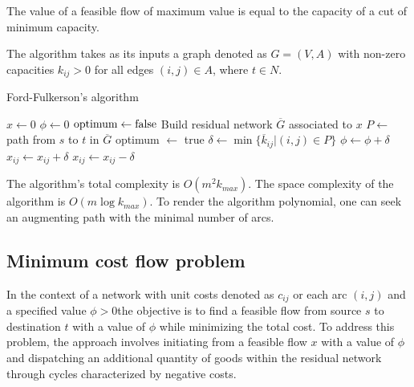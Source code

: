 \begin{theorem}
    The value of a feasible flow of maximum value is equal to the capacity of a cut of minimum capacity.
\end{theorem}
The algorithm takes as its inputs a graph denoted as $G=(V,A)$ with non-zero capacities $k_{ij}>0$ for all edges $(i,j) \in A$, where $t \in N$. 
\begin{algorithm}[H]
    \caption{Ford-Fulkerson's algorithm}
        \begin{algorithmic}[1]
            \State $x \leftarrow 0$
            \State $\phi \leftarrow 0$
            \State $\textnormal{optimum} \leftarrow \textnormal{false}$
                \State Build residual network $\overline{G}$ associated to $x$
                \State $P \leftarrow$ path from $s$ to $t$ in $\overline{G}$
                    \State optimum $\leftarrow$ true
                \Else
                    \State $\delta \leftarrow \min\{\overline{k}_{ij}|(i,j) \in P\}$
                    \State $\phi \leftarrow \phi + \delta$
                            \State $x_{ij} \leftarrow x_{ij}+\delta$
                        \Else 
                            \State $x_{ij} \leftarrow x_{ij}-\delta$
                        \EndIf
                    \EndFor
                \EndIf
            \EndWhile
        \end{algorithmic}
\end{algorithm}
The algorithm's total complexity is $O(m^2k_{max})$. 
The space complexity of the algorithm is $O(m\log{k_{max}})$. 
To render the algorithm polynomial, one can seek an augmenting path with the minimal number of arcs.

\subsection*{Minimum cost flow problem}
In the context of a network with unit costs denoted as $c_{ij}$ or each arc  $(i,j)$ and a specified value $\phi > 0$the objective is to find a feasible flow from source $s$ to destination $t$ with a value of $\phi$ while minimizing the total cost.
To address this problem, the approach involves initiating from a feasible flow $x$ with a value of $\phi$ and dispatching an additional quantity of goods within the residual network through cycles characterized by negative costs.

